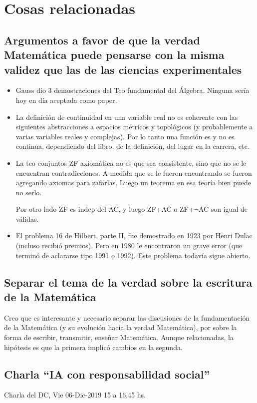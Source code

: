 \documentclass[a4paper,11pt]{article}
\begin{document}
\section{Cosas relacionadas}
\subsection{Argumentos a favor de que la verdad Matemática puede pensarse con la misma validez que las de las ciencias experimentales}
\begin{itemize}
	\item Gauss dio 3 demostraciones del Teo fundamental del Álgebra. Ninguna sería hoy en día aceptada como paper.
	\item La definición de continuidad en una variable real no es coherente con las siguientes abstracciones a espacios métricos y topológicos (y probablemente a varias variables reales y complejas). Por lo tanto una función es y no es continua, dependiendo del libro, de la definición, del lugar en la carrera, etc.
	\item La teo conjuntos ZF axiomática no es que sea consistente, sino que no se le encuentran contradicciones. A medida que se le fueron encontrando se fueron agregando axiomas para zafarlas. Luego un teorema en esa teoría bien puede no serlo.
	
	Por otro lado ZF es indep del AC, y luego ZF+AC o ZF+$\neg$AC son igual de válidas.
	
	\item El problema 16 de Hilbert, parte II, fue demostrado en 1923 por Henri Dulac (incluso recibió premios). Pero en 1980 le encontraron un grave error (que terminó de aclararse tipo 1991 o 1992). Este problema todavía sigue abierto.
\end{itemize}

\subsection{Separar el tema de la verdad sobre la escritura de la Matemática}
Creo que es interesante y necesario separar las discusiones de la fundamentación de la Matemática (y su evolución hacia la verdad Matemática), por sobre la forma de escribir, transmitir, enseñar Matemática. Aunque relacionadas, la hipótesis es que la primera implicó cambios en la segunda.


\subsection{Charla ``IA con responsabilidad social''}
Charla del DC, Vie 06-Dic-2019 15 a 16.45 hs.
\end{document}
